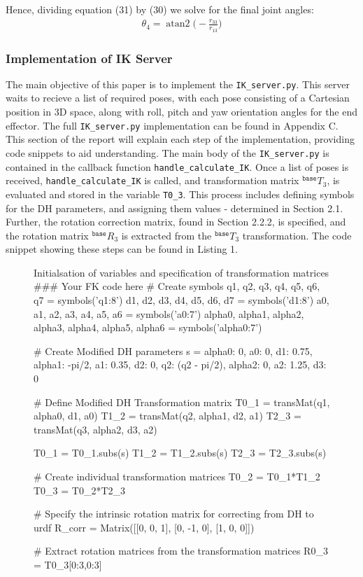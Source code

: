 \documentclass[a4paper]{article}
\DeclareMathOperator{\atantwo}{atan2}
\begin{document}
Hence, dividing equation (31) by (30) we solve for the final joint angles:
\begin{align}
\theta_4 = \atantwo \bigg(-\frac{r_{33}}{r_{13}}\bigg)
\end{align}

\subsubsection{Implementation of IK Server}
The main objective of this paper is to implement the \verb|IK_server.py|. This server waits to recieve a list of required poses, with each pose consisting of a Cartesian position in 3D space, along with roll, pitch and yaw orientation angles for the end effector. The full \verb|IK_server.py| implementation can be found in Appendix C. This section of the report will explain each step of the implementation, providing code snippets to aid understanding. The main body of the \verb|IK_server.py| is contained in the callback function \verb|handle_calculate_IK|. Once a list of poses is received, \verb|handle_calculate_IK| is called, and transformation matrix $^\texttt{base} T_3$, is evaluated and stored in the variable \verb|T0_3|. This process includes defining symbols for the DH parameters, and assigning them values - determined in Section 2.1. Further, the rotation correction matrix, found in Section 2.2.2, is specified, and the rotation matrix $^\texttt{base} R_3$ is extracted from the $^\texttt{base} T_3$ transformation. The code snippet showing these steps can be found in Listing 1. 

\begin{figure}[h]\footnotesize
	\begin{sexylisting}{Initialsation of variables and specification of transformation matrices}
### Your FK code here
# Create symbols
q1, q2, q3, q4, q5, q6, q7 = symbols('q1:8')
d1, d2, d3, d4, d5, d6, d7 = symbols('d1:8')
a0, a1, a2, a3, a4, a5, a6 = symbols('a0:7')
alpha0, alpha1, alpha2, alpha3, alpha4, alpha5, alpha6 = symbols('alpha0:7')

# Create Modified DH parameters
s = {alpha0:     0,    a0:      0,    d1: 0.75,
     alpha1: -pi/2,    a1:   0.35,    d2:    0,    q2: (q2 - pi/2),
     alpha2:     0,    a2:   1.25,    d3:    0}

# Define Modified DH Transformation matrix
T0_1 = transMat(q1, alpha0, d1, a0)
T1_2 = transMat(q2, alpha1, d2, a1)
T2_3 = transMat(q3, alpha2, d3, a2)

T0_1 = T0_1.subs(s)
T1_2 = T1_2.subs(s)
T2_3 = T2_3.subs(s)

# Create individual transformation matrices
T0_2 = T0_1*T1_2
T0_3 = T0_2*T2_3

# Specify the intrinsic rotation matrix for correcting from DH to urdf
R_corr = Matrix([[0,  0, 1],
[0, -1, 0],
[1,  0, 0]])

# Extract rotation matrices from the transformation matrices
R0_3 = T0_3[0:3,0:3]	
	\end{sexylisting}
\end{figure}
\end{document}
